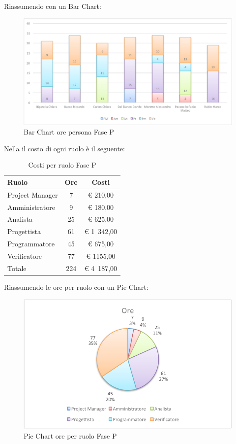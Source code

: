 				Riassumendo con un Bar Chart:
				\begin{figure}[H]\centering
					\includegraphics[width=\textwidth]{PianoDiProgetto/Pics/ChartOreFaseP.pdf}
					\caption{Bar Chart ore persona Fase P}
				\end{figure}
				Nella  il costo di ogni ruolo è il seguente:
				\begin{table}[H]
					\begin{center}
						\begin{tabular}{| l | c | c |}
							\hline
							Ruolo 				& Ore 	& Costi  \\ \hline
							
							Project Manager		& 7 		& \euro{} 210,00 	\\
							Amministratore 		& 9 		& \euro{} 180,00 	\\
							Analista	 		& 25 		& \euro{} 625,00 	\\
							Progettista 		& 61 		& \euro{} 1~342,00  	\\
							Programmatore		& 45 		& \euro{} 675,00 	\\
							Verificatore		& 77 		& \euro{} 1155,00 	\\ \hline \hline
							
							Totale	 			& 224 		& \euro{} 4~187,00 	\\ \hline
						\end{tabular}
					\end{center}
					\caption{Costi per ruolo Fase P}
				\end{table}
				Riassumendo le ore per ruolo con un Pie Chart:
				\begin{figure}[H]\centering
					\includegraphics[width=\textwidth]{PianoDiProgetto/Pics/ChartTotOreFaseP.pdf}
					\caption{Pie Chart ore per ruolo Fase P}
				\end{figure}
